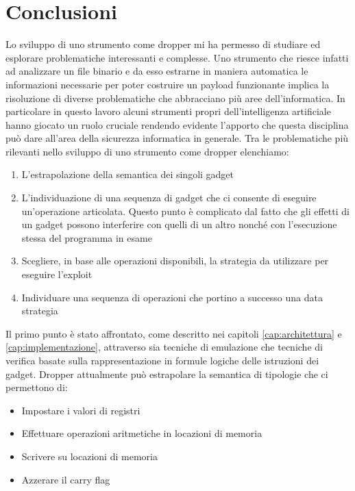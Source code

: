 \chapter{Conclusioni}

Lo sviluppo di uno strumento come dropper mi ha permesso di studiare
ed esplorare problematiche interessanti e complesse. Uno strumento che
riesce infatti ad analizzare un file binario e da esso estrarne in
maniera automatica le informazioni necessarie per poter costruire un
payload funzionante implica la risoluzione di diverse problematiche
che abbracciano più aree dell'informatica. In particolare in questo
lavoro alcuni strumenti propri dell'intelligenza artificiale hanno
giocato un ruolo cruciale rendendo evidente l'apporto che questa
disciplina può dare all'area della sicurezza informatica in
generale. Tra le problematiche più rilevanti nello sviluppo di uno
strumento come dropper elenchiamo:

\begin{enumerate}
\item L'estrapolazione della semantica dei singoli gadget
\item L'individuazione di una sequenza di gadget che ci consente di
  eseguire un'operazione articolata. Questo punto è complicato dal
  fatto che gli effetti di un gadget possono interferire con quelli di
  un altro nonché con l'esecuzione stessa del programma in esame
\item Scegliere, in base alle operazioni disponibili, la strategia da
  utilizzare per eseguire l'exploit
\item Individuare una sequenza di operazioni che portino a successo una
  data strategia
\end{enumerate}

Il primo punto è stato affrontato, come descritto nei capitoli
\ref{cap:architettura} e \ref{cap:implementazione}, attraverso sia
tecniche di emulazione che tecniche di verifica basate sulla
rappresentazione in formule logiche delle istruzioni dei
gadget. Dropper attualmente può estrapolare la semantica di tipologie
che ci permettono di:

\begin{itemize}
\item Impostare i valori di registri
\item Effettuare operazioni aritmetiche in locazioni di memoria
\item Scrivere su locazioni di memoria
\item Azzerare il carry flag
\end{itemize}

